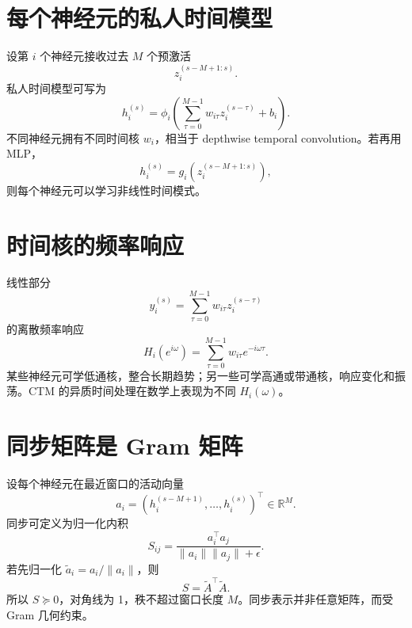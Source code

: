 \documentclass[UTF8,12pt,a4paper,fontset=none]{ctexart}
\numberwithin{equation}{section}
\newcommand{\R}{\mathbb{R}}
\begin{document}
\section{每个神经元的私人时间模型}
设第 $i$ 个神经元接收过去 $M$ 个预激活
\begin{equation}
 z_i^{(s-M+1:s)}.
\end{equation}
私人时间模型可写为
\begin{equation}
 h_i^{(s)}=\phi_i\left(
 \sum_{\tau=0}^{M-1}w_{i\tau}z_i^{(s-\tau)}+b_i
 \right).
\end{equation}
不同神经元拥有不同时间核 $w_i$，相当于 depthwise temporal convolution。若再用 MLP，
\begin{equation}
 h_i^{(s)}=g_i(z_i^{(s-M+1:s)}),
\end{equation}
则每个神经元可以学习非线性时间模式。

\section{时间核的频率响应}
线性部分
\begin{equation}
 y_i^{(s)}=\sum_{\tau=0}^{M-1}w_{i\tau}z_i^{(s-\tau)}
\end{equation}
的离散频率响应
\begin{equation}
 H_i(e^{i\omega})=
 \sum_{\tau=0}^{M-1}w_{i\tau}e^{-i\omega\tau}.
\end{equation}
某些神经元可学低通核，整合长期趋势；另一些可学高通或带通核，响应变化和振荡。CTM 的异质时间处理在数学上表现为不同 $H_i(\omega)$。

\section{同步矩阵是 Gram 矩阵}
设每个神经元在最近窗口的活动向量
\begin{equation}
 a_i=(h_i^{(s-M+1)},\ldots,h_i^{(s)})^\top\in\R^M.
\end{equation}
同步可定义为归一化内积
\begin{equation}
 S_{ij}=\frac{a_i^\top a_j}
 {\|a_i\|\|a_j\|+\epsilon}.
\end{equation}
若先归一化 $\widetilde a_i=a_i/\|a_i\|$，则
\begin{equation}
 S=\widetilde A^\top\widetilde A.
\end{equation}
所以 $S\succeq0$，对角线为 1，秩不超过窗口长度 $M$。同步表示并非任意矩阵，而受 Gram 几何约束。
\end{document}
